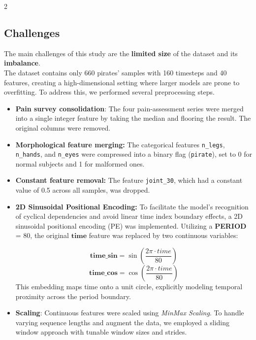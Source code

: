 \documentclass[11pt]{article}
\begin{document}
\begin{multicols}{2}
        \subsection{Challenges}
        The main challenges of this study are the \textbf{limited size} of the dataset and its \textbf{imbalance}.\\
        The dataset contains only 660 pirates' samples with 160 timesteps and 40 features, creating a high-dimensional setting where larger models are prone to overfitting. To address this, we performed several preprocessing steps.
        \begin{itemize}
            \item \textbf{Pain survey consolidation}:
            The four pain-assessment series were merged into a single integer feature by taking the median and flooring the result. The original columns were removed.
        \end{itemize}
        \begin{itemize}
            \item \textbf{Morphological feature merging:} The categorical features \texttt{n\_legs}, \texttt{n\_hands}, and \texttt{n\_eyes} were compressed into a binary flag (\texttt{pirate}), set to 0 for normal subjects and 1 for malformed ones.
        \end{itemize}
        \begin{itemize}
            \item \textbf{Constant feature removal:} The feature \texttt{joint\_30}, which had a constant value of 0.5 across all samples, was dropped.
        \end{itemize}
        \begin{itemize}
            \item \textbf{2D Sinusoidal Positional Encoding: }     
            To facilitate the model's recognition of cyclical dependencies and avoid linear time index boundary effects, a 2D sinusoidal positional encoding (PE) was implemented. Utilizing a {\textbf{PERIOD}} = 80, the original $\mathbf{time}$ feature was replaced by two continuous variables:

            $$\mathbf{time\_sin} = \sin \left(\frac{2 \pi \cdot time}{80}\right)$$
            $$\mathbf{time\_cos} = \cos \left(\frac{2 \pi \cdot time}{80}\right)$$This embedding maps time onto a unit circle, explicitly modeling temporal proximity across the period boundary.
        \end{itemize}
        \begin{itemize}
            \item \textbf{Scaling}: Continuous features were scaled using \textit{MinMax Scaling}. To handle varying sequence lengths and augment the data, we employed a sliding window approach with tunable window sizes and strides.
        \end{itemize}
        

\end{multicols}
\end{document}
